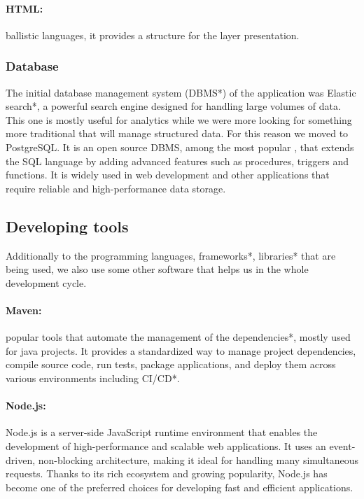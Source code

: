 \documentclass[12pt,a4paper,table,english]{article}
\begin{document}
	\paragraph{HTML:} ballistic languages, it provides a structure for the layer presentation. 

	\subsubsection{Database}
	
	The initial database management system (DBMS*) of the application was Elastic search*, a powerful search engine designed for handling large volumes of data. This one is mostly useful for analytics while we were more looking for something more traditional that will manage structured data. For this reason we moved to PostgreSQL. It is an open source DBMS, among the most popular \citep{stat1, stat2}, that extends the SQL language by adding advanced features such as procedures, triggers and functions. It is widely used in web development and other applications that require reliable and high-performance data storage.
	
	
	\subsection{Developing tools}
	
	Additionally to the programming languages, frameworks*, libraries* that are being used, we also use some other software that helps us in the whole development cycle.
	
	\paragraph{Maven:} popular tools that automate the management of the dependencies*, mostly used for java projects. It provides a standardized way to manage project dependencies, compile source code, run tests, package applications, and deploy them across various environments including CI/CD*. 
	
	\paragraph{Node.js:} Node.js is a server-side JavaScript runtime environment that enables the development of high-performance and scalable web applications. It uses an event-driven, non-blocking architecture, making it ideal for handling many simultaneous requests. Thanks to its rich ecosystem and growing popularity, Node.js has become one of the preferred choices for developing fast and efficient applications.
	
\end{document}
